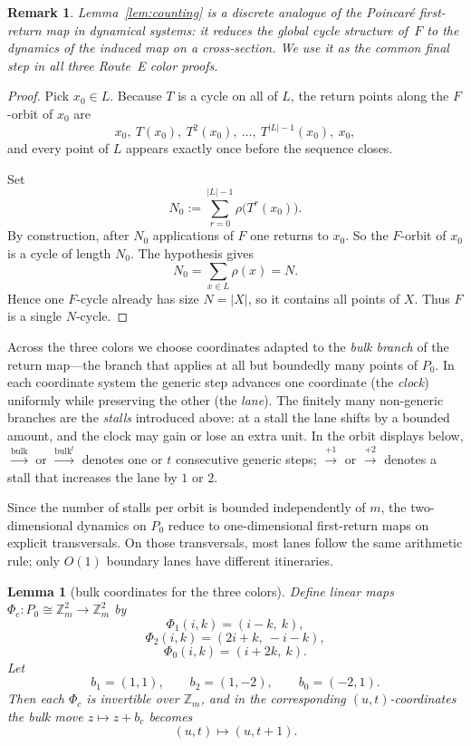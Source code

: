 \documentclass[11pt]{article}
\newtheorem{lemma}{Lemma}
\newtheorem{remark}{Remark}
\newcommand{\Zm}{\mathbb Z_m}
\newcommand{\bulk}{\mathrm{bulk}}   %
\begin{document}
\begin{remark}
Lemma~\ref{lem:counting} is a discrete analogue of the Poincar\'e first-return map in dynamical systems: it reduces the global cycle structure of~$F$ to the dynamics of the induced map on a cross-section.  We use it as the common final step in all three Route~E color proofs.
\end{remark}

\begin{proof}
Pick $x_0\in L$.
Because $T$ is a cycle on all of $L$, the return points along the $F$-orbit of $x_0$ are
\[
x_0,\ T(x_0),\ T^2(x_0),\ \dots,\ T^{|L|-1}(x_0),\ x_0,
\]
and every point of $L$ appears exactly once before the sequence closes.

Set
\[
N_0:=\sum_{r=0}^{|L|-1}\rho\bigl(T^r(x_0)\bigr).
\]
By construction, after $N_0$ applications of $F$ one returns to $x_0$.
So the $F$-orbit of $x_0$ is a cycle of length $N_0$.
The hypothesis gives
\[
N_0=\sum_{x\in L}\rho(x)=N.
\]
Hence one $F$-cycle already has size $N=|X|$, so it contains all points of $X$.
Thus $F$ is a single $N$-cycle.
\end{proof}

Across the three colors we choose coordinates adapted to the \emph{bulk branch} of the return map---the branch that applies at all but boundedly many points of $P_0$.
In each coordinate system the generic step advances one coordinate (the \emph{clock}) uniformly while preserving the other (the \emph{lane}).
The finitely many non-generic branches are the \emph{stalls} introduced above: at a stall the lane shifts by a bounded amount, and the clock may gain or lose an extra unit.
In the orbit displays below, $\xrightarrow{\bulk}$ or $\xrightarrow{\bulk^t}$ denotes one or $t$ consecutive generic steps; $\xrightarrow{+1}$ or $\xrightarrow{+2}$ denotes a stall that increases the lane by $1$ or $2$.

Since the number of stalls per orbit is bounded independently of $m$, the two-dimensional dynamics on $P_0$ reduce to one-dimensional first-return maps on explicit transversals.
On those transversals, most lanes follow the same arithmetic rule; only $O(1)$ boundary lanes have different itineraries.

\begin{lemma}[bulk coordinates for the three colors]\label{lem:routeE-bulkcoords}
Define linear maps $\Phi_c:P_0\cong \Zm^2\to \Zm^2$ by
\[
\Phi_1(i,k)=(i-k,\ k),
\]
\[
\Phi_2(i,k)=(2i+k,\ -i-k),
\]
\[
\Phi_0(i,k)=(i+2k,\ k).
\]
Let
\[
b_1=(1,1),\qquad b_2=(1,-2),\qquad b_0=(-2,1).
\]
Then each $\Phi_c$ is invertible over $\Zm$, and in the corresponding $(u,t)$-coordinates the bulk move $z\mapsto z+b_c$ becomes
\[
(u,t)\mapsto (u,t+1).
\]
\end{lemma}
\end{document}
